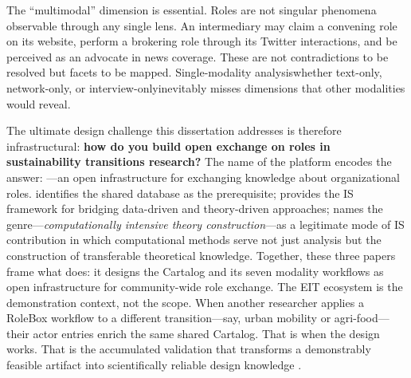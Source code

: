 \documentclass[../main.tex]{subfiles}
\begin{document}
The ``multimodal'' dimension is essential. Roles are not singular phenomena observable through any single lens. An intermediary may claim a convening role on its website, perform a brokering role through its Twitter interactions, and be perceived as an advocate in news coverage. These are not contradictions to be resolved but facets to be mapped. Single-modality analysis\textemdash whether text-only, network-only, or interview-only\textemdash inevitably misses dimensions that other modalities would reveal.

The ultimate design challenge this dissertation addresses is therefore infrastructural: \textbf{how do you build open exchange on roles in sustainability transitions research?} The name of the platform encodes the answer: \RoleBox{}---an open infrastructure for exchanging knowledge about organizational roles. \textcite{dehaan2025makingscience} identifies the shared database as the prerequisite; \textcite{maass2018data} provides the IS framework for bridging data-driven and theory-driven approaches; \textcite{miranda2022computationally} names the genre---\emph{computationally intensive theory construction}---as a legitimate mode of IS contribution in which computational methods serve not just analysis but the construction of transferable theoretical knowledge. Together, these three papers frame what \RoleBox{} does: it designs the Cartalog and its seven modality workflows as open infrastructure for community-wide role exchange. The EIT ecosystem is the demonstration context, not the scope. When another researcher applies a RoleBox workflow to a different transition---say, urban mobility or agri-food---their actor entries enrich the same shared Cartalog. That is when the design works. That is the accumulated validation that transforms a demonstrably feasible artifact into scientifically reliable design knowledge \parencite{vombrocke2020accumulation}.
\end{document}
